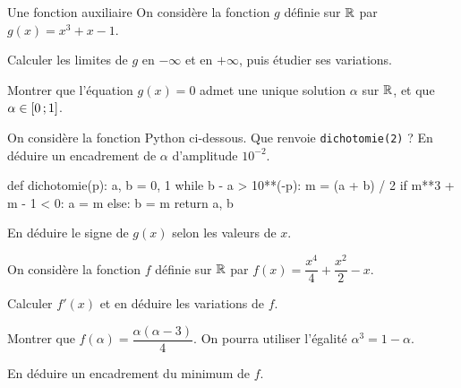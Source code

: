 \begin{exercice}[3]{Une fonction auxiliaire}
On considère la fonction $g$ définie sur $\mathbb{R}$ par $g(x)=x^{3}+x-1$.
\begin{questions}
  \item Calculer les limites de $g$ en $-\infty$ et en $+\infty$, puis étudier ses variations.
  \item Montrer que l'équation $g(x)=0$ admet une unique solution $\alpha$ sur $\mathbb{R}$, et que $\alpha\in\mathopen{[}0\,{;}\,1\mathclose{]}$.
  \item On considère la fonction Python ci-dessous. Que renvoie \lstinline[style=otPython]!dichotomie(2)! ? En déduire un
    encadrement de $\alpha$ d'amplitude $10^{-2}$.
\begin{python}
def dichotomie(p):
    a, b = 0, 1
    while b - a > 10**(-p):
        m = (a + b) / 2
        if m**3 + m - 1 < 0:
            a = m
        else:
            b = m
    return a, b
\end{python}
  \item En déduire le signe de $g(x)$ selon les valeurs de $x$.
\end{questions}
On considère la fonction $f$ définie sur $\mathbb{R}$ par $f(x)=\dfrac{x^{4}}{4}+\dfrac{x^{2}}{2}-x$.
\begin{questions}[resume]
  \item Calculer $f'(x)$ et en déduire les variations de $f$.
  \item Montrer que $f(\alpha)=\dfrac{\alpha(\alpha-3)}{4}$. On pourra utiliser l'égalité $\alpha^{3}=1-\alpha$.
  \item En déduire un encadrement du minimum de $f$.
\end{questions}
\end{exercice}

